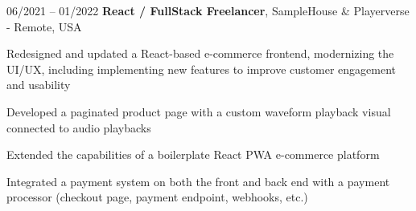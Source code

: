 

\begin{twocolentry}{
    06/2021 – 01/2022
}
\fontsize{11 pt}{11 pt}\textbf{React / FullStack Freelancer}, SampleHouse \& Playerverse - Remote, USA\end{twocolentry}

\vspace{0.10 cm}
\begin{onecolentry}
   \begin{highlights}
       \item Redesigned and updated a React-based e-commerce frontend, modernizing the UI/UX, including implementing new features to improve customer engagement and usability
       \item Developed a paginated product page with a custom waveform playback visual connected to audio playbacks
       \item Extended the capabilities of a boilerplate React PWA e-commerce platform
       \item Integrated a payment system on both the front and back end with a payment processor (checkout page, payment endpoint, webhooks, etc.)
   \end{highlights}
\end{onecolentry}